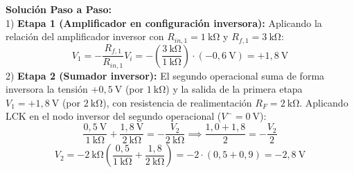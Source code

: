\begin{ejercicio}
\textbf{Solución Paso a Paso:}\\[4pt]
1) \textbf{Etapa 1 (Amplificador en configuración inversora):}
Aplicando la relación del amplificador inversor con $R_{in,1} = 1\ \si{\kilo\ohm}$ y $R_{f,1} = 3\ \si{\kilo\ohm}$:
\begin{equation}
    V_1 = -\frac{R_{f,1}}{R_{in,1}} V_i = -\left(\frac{3\ \si{\kilo\ohm}}{1\ \si{\kilo\ohm}}\right) \cdot (-0{,}6\ \si{\volt}) = +1{,}8\ \si{\volt}
\end{equation}
2) \textbf{Etapa 2 (Sumador inversor):}
El segundo operacional suma de forma inversora la tensión $+0{,}5\ \si{\volt}$ (por $1\ \si{\kilo\ohm}$) y la salida de la primera etapa $V_1 = +1{,}8\ \si{\volt}$ (por $2\ \si{\kilo\ohm}$), con resistencia de realimentación $R_F = 2\ \si{\kilo\ohm}$. Aplicando LCK en el nodo inversor del segundo operacional ($V^- = 0\ \si{\volt}$):
\begin{equation}
    \frac{0{,}5\ \si{\volt}}{1\ \si{\kilo\ohm}} + \frac{1{,}8\ \si{\volt}}{2\ \si{\kilo\ohm}} = -\frac{V_2}{2\ \si{\kilo\ohm}} \implies \frac{1{,}0 + 1{,}8}{2} = -\frac{V_2}{2}
\end{equation}
\begin{equation}
    \boxed{V_2 = -2\ \si{\kilo\ohm} \left(\frac{0{,}5}{1\ \si{\kilo\ohm}} + \frac{1{,}8}{2\ \si{\kilo\ohm}}\right) = -2 \cdot (0{,}5 + 0{,}9) = -2{,}8\ \si{\volt}}
\end{equation}
\end{ejercicio}

